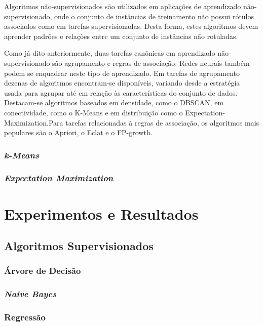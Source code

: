 \documentclass{article}
\begin{document}
Algoritmos não-supervisionados são utilizados em aplicações de aprendizado não-supervisionado, onde o conjunto de instâncias de treinamento não possui rótulos associados como em tarefas supervisionadas. Desta forma, estes algoritmos devem aprender padrões e relações entre um conjunto de instâncias não rotuladas.

Como já dito anteriormente, duas tarefas canônicas em aprendizado não-supervisionado são agrupamento e regras de associação. Redes neurais também podem se enquadrar neste tipo de aprendizado. Em tarefas de agrupamento dezenas de algoritmos encontram-se disponíveis, variando desde a estratégia usada para agrupar até em relação às características do conjunto de dados. Destacam-se algoritmos baseados em densidade, como o DBSCAN, em conectividade, como o K-Means e em distribuição como o Expectation-Maximization.Para tarefas relacionadas à regras de associação, os algoritmos mais populares são o Apriori, o Eclat e o FP-growth.  

\subsubsection{{\b \it k-Means}}

\subsubsection{{\b \it Expectation Maximization}}

\section{Experimentos e Resultados}

\subsection{Algoritmos Supervisionados}

\subsubsection{Árvore de Decisão}

\subsubsection{{\b \it Naive Bayes}}

\subsubsection{Regressão}
\end{document}
